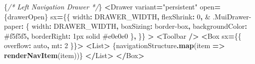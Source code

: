 \documentclass[
]{article}
\newenvironment{Shaded}{\begin{snugshade}}{\end{snugshade}}
\newcommand{\CommentTok}[1]{\textcolor[rgb]{0.56,0.35,0.01}{\textit{#1}}}
\newcommand{\DecValTok}[1]{\textcolor[rgb]{0.00,0.00,0.81}{#1}}
\newcommand{\FunctionTok}[1]{\textcolor[rgb]{0.13,0.29,0.53}{\textbf{#1}}}
\newcommand{\KeywordTok}[1]{\textcolor[rgb]{0.13,0.29,0.53}{\textbf{#1}}}
\newcommand{\NormalTok}[1]{#1}
\newcommand{\OperatorTok}[1]{\textcolor[rgb]{0.81,0.36,0.00}{\textbf{#1}}}
\newcommand{\StringTok}[1]{\textcolor[rgb]{0.31,0.60,0.02}{#1}}
\begin{document}
\begin{Shaded}
\begin{Highlighting}[]
\NormalTok{        \{}\CommentTok{/* Left Navigation Drawer */}\NormalTok{\}}
        \OperatorTok{\textless{}}\NormalTok{Drawer}
\NormalTok{          variant}\OperatorTok{=}\StringTok{"persistent"}
\NormalTok{          open}\OperatorTok{=}\NormalTok{\{drawerOpen\}}
\NormalTok{          sx}\OperatorTok{=}\NormalTok{\{\{}
\NormalTok{            width}\OperatorTok{:}\NormalTok{ DRAWER\_WIDTH}\OperatorTok{,}
\NormalTok{            flexShrink}\OperatorTok{:} \DecValTok{0}\OperatorTok{,}
            \StringTok{\textquotesingle{}\& .MuiDrawer{-}paper\textquotesingle{}}\OperatorTok{:}\NormalTok{ \{}
\NormalTok{              width}\OperatorTok{:}\NormalTok{ DRAWER\_WIDTH}\OperatorTok{,}
\NormalTok{              boxSizing}\OperatorTok{:} \StringTok{\textquotesingle{}border{-}box\textquotesingle{}}\OperatorTok{,}
\NormalTok{              backgroundColor}\OperatorTok{:} \StringTok{\textquotesingle{}\#f5f5f5\textquotesingle{}}\OperatorTok{,}
\NormalTok{              borderRight}\OperatorTok{:} \StringTok{\textquotesingle{}1px solid \#e0e0e0\textquotesingle{}}
\NormalTok{            \}}\OperatorTok{,}
\NormalTok{          \}\}}
        \OperatorTok{\textgreater{}}
          \OperatorTok{\textless{}}\NormalTok{Toolbar }\OperatorTok{/\textgreater{}}
          \OperatorTok{\textless{}}\NormalTok{Box sx}\OperatorTok{=}\NormalTok{\{\{ overflow}\OperatorTok{:} \StringTok{\textquotesingle{}auto\textquotesingle{}}\OperatorTok{,}\NormalTok{ mt}\OperatorTok{:} \DecValTok{2}\NormalTok{ \}\}}\OperatorTok{\textgreater{}}
            \OperatorTok{\textless{}}\NormalTok{List}\OperatorTok{\textgreater{}}
\NormalTok{              \{navigationStructure}\OperatorTok{.}\FunctionTok{map}\NormalTok{(item }\KeywordTok{=\textgreater{}} \FunctionTok{renderNavItem}\NormalTok{(item))\}}
            \OperatorTok{\textless{}/}\NormalTok{List}\OperatorTok{\textgreater{}}
          \OperatorTok{\textless{}/}\NormalTok{Box}\OperatorTok{\textgreater{}}


\end{Highlighting}
\end{Shaded}
\end{document}
